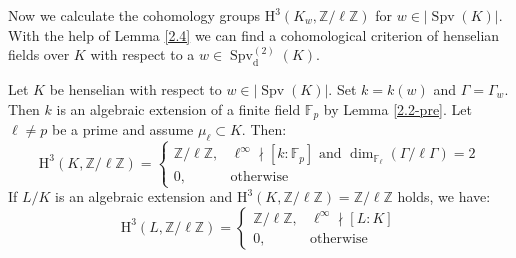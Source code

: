Now we calculate the cohomology groups $\mathrm{H}^3(K_w,\mathbb{Z}/\ell\mathbb{Z})$ for $w\in |\operatorname{Spv}(K)|$. With the help of Lemma \ref{2.4} we can find a cohomological criterion of henselian fields over $K$ with respect to a $w\in\operatorname{Spv}_\text{d}^{(2)}(K)$.

\begin{lemma}\label{2.5}
Let $K$ be henselian with respect to $w\in|\operatorname{Spv}(K)|$. Set $k=k(w)$ and $\Gamma = \Gamma_w$. Then $k$ is an algebraic extension of a finite field $\mathbb{F}_p$ by Lemma \ref{2.2-pre}. Let $\ell\neq p$ be a prime and assume $\mu_\ell\subset K$. Then:
\[ \mathrm{H}^3(K, \mathbb{Z}/\ell\mathbb{Z}) = \begin{cases}
\mathbb{Z}/\ell\mathbb{Z}, & \ell^\infty\nmid [k:\mathbb{F}_p] \text{ and } \dim_{\mathbb{F}_\ell}(\Gamma / \ell\Gamma) = 2\\
0, & \text{otherwise}
\end{cases} \]
If $L/K$ is an algebraic extension and $\mathrm{H}^3(K, \mathbb{Z}/\ell\mathbb{Z}) = \mathbb{Z}/\ell\mathbb{Z}$ holds, we have:
\[ \mathrm{H}^3(L,\mathbb{Z}/\ell\mathbb{Z}) = \begin{cases}
\mathbb{Z}/\ell\mathbb{Z}, & \ell^\infty\nmid [L:K]\\
0, & \text{otherwise}
\end{cases} \]
\end{lemma}

